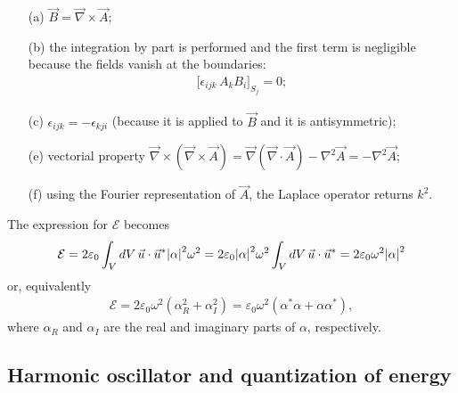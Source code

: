 \begin{itemize}
    \item[(a)] $\Vec{B}=\Vec{\nabla}\times\Vec{A}$;
    \item [(b)] the integration by part is performed and the first term is negligible because the fields vanish at the boundaries: 
    \begin{align*}
        \bigg[\epsilon_{ijk}\,A_{k}B_{i}\bigg]_{S_j} = 0;
    \end{align*}
    \item[(c)] $\epsilon_{ijk} = - \epsilon_{kji}$ (because it is applied to $\Vec{B}$ and it is antisymmetric);
    \item [(e)] vectorial property $\vec{\nabla}\times(\vec{\nabla}\times\vec{A}) =\vec{\nabla}(\vec{\nabla}\cdot \vec{A})-\nabla^{2}\vec{A} = -\nabla^{2}\vec{A}$; 
    \item[(f)] using the Fourier representation of $\vec{A}$, the Laplace operator returns $k^{2}$. 
\end{itemize}
The expression for $\mathcal{E}$ becomes
\begin{align*}
        \mathcal{E} = 2\varepsilon_{0} \int_{V}{dV \, \Vec{u} \cdot \Vec{u}^{*}\abs{\alpha}^{2}\omega^{2}} = 2\varepsilon_{0} \abs{\alpha}^{2}\omega^{2} \int_{V} dV \, \Vec{u} \cdot \Vec{u}^{*} = 2\varepsilon_{0}\omega^{2}\abs{\alpha}^{2} 
\end{align*}
or, equivalently 
\begin{align}
        \mathcal{E} = 2\varepsilon_{0}\omega^{2}(\alpha_R^2 + \alpha_I^2) = \varepsilon_0 \omega^2 (\alpha^* \alpha + \alpha \alpha^*), 
        \label{eq:en_clas}
\end{align}
where $\alpha_R$ and $\alpha_I$ are the real and imaginary parts of $\alpha$, respectively. 

\subsection{Harmonic oscillator and quantization of energy}


